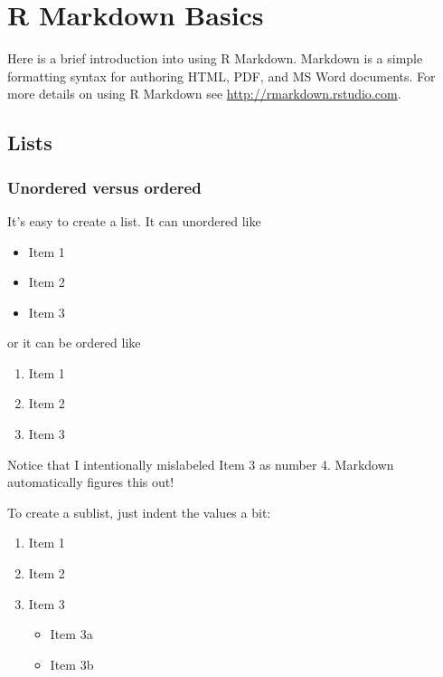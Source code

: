 \documentclass[12pt,twoside]{reedthesis}
\providecommand{\tightlist}{%
  \setlength{\itemsep}{0pt}\setlength{\parskip}{0pt}}
\begin{document}
  \chapter{R Markdown Basics}
  
  Here is a brief introduction into using R Markdown. Markdown is a simple
  formatting syntax for authoring HTML, PDF, and MS Word documents. For
  more details on using R Markdown see \url{http://rmarkdown.rstudio.com}.
  
  \section{Lists}\label{lists}
  
  \subsection{Unordered versus ordered}\label{unordered-versus-ordered}
  
  It's easy to create a list. It can unordered like
  
  \begin{itemize}
  \tightlist
  \item
    Item 1
  \item
    Item 2
  \item
    Item 3
  \end{itemize}
  
  or it can be ordered like
  
  \begin{enumerate}
  \def\labelenumi{\arabic{enumi}.}
  \tightlist
  \item
    Item 1
  \item
    Item 2
  \item
    Item 3
  \end{enumerate}
  
  Notice that I intentionally mislabeled Item 3 as number 4. Markdown
  automatically figures this out!
  
  To create a sublist, just indent the values a bit:
  
  \begin{enumerate}
  \def\labelenumi{\arabic{enumi}.}
  \tightlist
  \item
    Item 1
  \item
    Item 2
  \item
    Item 3
  
    \begin{itemize}
    \tightlist
    \item
      Item 3a
    \item
      Item 3b
    \end{itemize}
  \end{enumerate}
  
\end{document}
